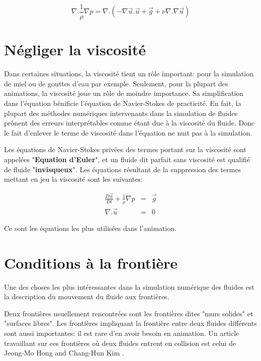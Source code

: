\documentclass[11pt]{report}
\begin{document}
\begin{equation}
\nabla . \frac{1}{\rho}\nabla p = \nabla . (-\nabla \overrightarrow{u} . \overrightarrow{u}+ \overrightarrow{g} + \nu \nabla . \nabla \overrightarrow{u}) 
\end{equation}


\section{Négliger la viscosité}	

Dans certaines situations, la viscosité tient un rôle important: pour la simulation de miel ou de gouttes d'eau par exemple. Seulement, pour la plupart des animations, la viscosité joue un rôle de moindre importance. Sa simplification dans l'équation bénificie l'équation de Navier-Stokes de practicité. En fait, la plupart des méthodes numériques intervenants dans la simulation de fluides prônent des erreurs interprétables comme étant due à la viscosité du fluide. Donc le fait d'enlever le terme de viscosité dans l'équation ne nuit pas à la simulation. 

Les équations de Navier-Stokes privées des termes portant sur la viscosité sont appelées "\textbf{Equation d'Euler}", et un fluide dit parfait sans viscosité est qualifié de fluide "\textbf{invisqueux}". Les équations résultant de la suppression des termes mettant en jeu la viscosité sont les suivantes:

\begin{eqnarray}
\frac{D\overrightarrow{u}}{Dt} + \frac{1}{\rho} \nabla p & = & \overrightarrow{g} \\
\nabla . \overrightarrow{u} & = & 0
\end{eqnarray}

Ce sont les équations les plus utilisées dans l'animation.

\section{Conditions à la frontière}	

Une des choses les plus intéressantes dans la simulation numérique des fluides est la description du mouvement du fluide aux frontières. 

Deux frontières usuellement rencontrées sont les frontières dites "murs solides" et "surfaces libres". Les frontières impliquant la frontière entre deux fluides différents sont aussi importantes: il est rare d'en avoir besoin en animation. Un article travaillant sur ces frontières où deux fluides entrent en collision est celui de Jeong-Mo Hong and Chang-Hun Kim \cite{Hong-05}.
\end{document}
